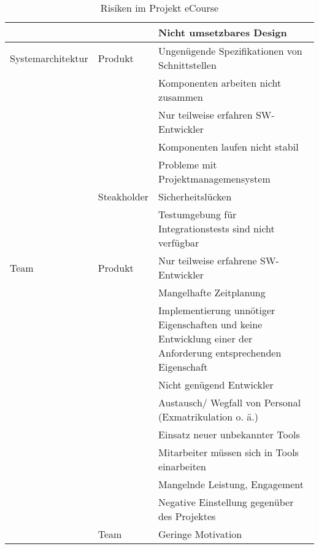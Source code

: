 \begin{table}
\begin{tabularx}{\textwidth}{|l|l|X|}
\hline
 &  & Nicht umsetzbares Design  \\ 
\hline
Systemarchitektur & Produkt & Ungenügende Spezifikationen von Schnittstellen  \\ 
\hline
 &  & Komponenten arbeiten nicht zusammen\\ 
\hline
 &  & Nur teilweise erfahren SW-Entwickler  \\ 
\hline
 &  & Komponenten laufen nicht stabil  \\ 
\hline
 &  & Probleme mit Projektmanagemensystem \\ 
\hline
 & Steakholder & Sicherheitslücken\\ 
\hline
 &  & Testumgebung für Integrationstests sind nicht verfügbar  \\ 
\hline
Team & Produkt & Nur teilweise erfahrene SW-Entwickler  \\ 
\hline
 &  & Mangelhafte Zeitplanung   \\ 
\hline
 &  & Implementierung unnötiger Eigenschaften und keine Entwicklung einer der Anforderung entsprechenden Eigenschaft  \\ 
\hline
 &  & Nicht genügend Entwickler  \\ 
\hline
 &  & Austausch/ Wegfall von Personal (Exmatrikulation o. ä.)   \\ 
\hline
 &  & Einsatz neuer unbekannter Tools  \\ 
\hline
 &  & Mitarbeiter müssen sich in Tools einarbeiten  \\ 
\hline
 &  & Mangelnde Leistung, Engagement  \\ 
\hline
 &  & Negative Einstellung gegenüber des Projektes  \\ 
\hline
 & Team & Geringe Motivation\\ 
\hline
\end{tabularx}
\caption{Risiken im Projekt eCourse}
\label{tab:Risiken}
\end{table}